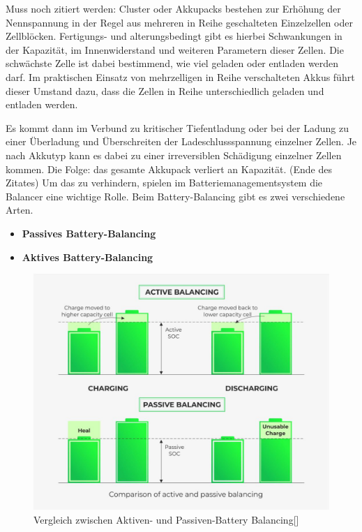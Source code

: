 Muss noch zitiert werden: Cluster oder Akkupacks bestehen zur Erhöhung der Nennspannung in der Regel aus mehreren in Reihe geschalteten Einzelzellen oder Zellblöcken. Fertigungs- und alterungsbedingt gibt es hierbei Schwankungen in der Kapazität, im Innenwiderstand und weiteren Parametern dieser Zellen. Die schwächste Zelle ist dabei bestimmend, wie viel geladen oder entladen werden darf. Im praktischen Einsatz von mehrzelligen in Reihe verschalteten Akkus führt dieser Umstand dazu, dass die Zellen in Reihe unterschiedlich geladen und entladen werden.

Es kommt dann im Verbund zu kritischer Tiefentladung oder bei der Ladung zu einer Überladung und Überschreiten der Ladeschlussspannung einzelner Zellen. Je nach Akkutyp kann es dabei zu einer irreversiblen Schädigung einzelner Zellen kommen. Die Folge: das gesamte Akkupack verliert an Kapazität. (Ende des Zitates)
Um das zu verhindern, spielen im Batteriemanagementsystem die Balancer eine wichtige Rolle. Beim Battery-Balancing gibt es zwei verschiedene Arten. 
\begin{itemize}
\item \textbf{Passives Battery-Balancing}
\item \textbf{Aktives Battery-Balancing} \medskip\\
\end{itemize}

\begin{figure}[H]
	\begin{center}
		\includegraphics[scale=1.5]{figures/Akku/Vergleichaktivespassives.jpg}
		\caption{Vergleich zwischen Aktiven- und Passiven-Battery Balancing[\cite{VergleichBalancing}]}
		\label{fig: Vergleich zwischen Aktiven- und Passiven-Battery Balancing}
	\end{center}
\end{figure}
\newpage

